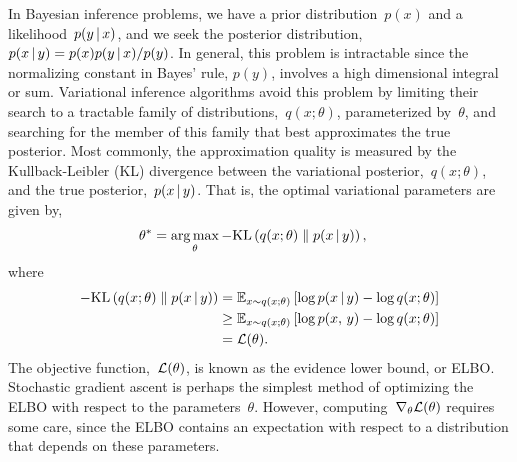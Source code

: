 In Bayesian inference problems, we have a prior distribution~$p(x)$
and a likelihood~$p(y \, | \, x)$, and
we seek the posterior distribution,~${p(x \, | \, y) = p(x) p(y \, | \, x) / p(y)}$.
In general, this problem is intractable since the normalizing constant
in Bayes' rule, $p(y)$, involves a high dimensional integral or sum.
Variational inference algorithms avoid this problem by limiting their
search to a tractable family of distributions,~$q(x; \theta)$,
parameterized by~$\theta$, and searching for the member of this family
that best approximates the true posterior. Most commonly, the
approximation quality is measured by the Kullback-Leibler (KL)
divergence between the variational posterior,~$q(x; \theta)$, and the
true posterior,~$p(x \, | \, y)$. That is, the optimal variational
parameters are given by,
\begin{align}
  \theta^* &= \operatorname*{arg\,max}_\theta -\textrm{KL}\left(q(x; \theta)\;\|\;p(x \, | \, y)\right),
\end{align}
where
\begin{align}
  -\textrm{KL}\left(q(x; \theta)\;\|\;p(x \, | \, y)\right) &= \mathbb{E}_{x \sim q(x; \theta)}
  \left[ \log p(x \, | \, y) - \log q(x; \theta) \right] \\
  &\geq \mathbb{E}_{x \sim q(x; \theta)}
  \left[ \log p(x, \, y) - \log q(x; \theta) \right] \\
  &= \mathcal{L}(\theta).
\end{align}
The objective function,~$\mathcal{L}(\theta)$, is known as the evidence lower bound, or ELBO.
Stochastic gradient ascent is
perhaps the simplest method of optimizing the ELBO with respect to
the parameters~$\theta$.
However, computing~$\nabla_\theta \mathcal{L}(\theta)$ requires some care,
since the ELBO contains an expectation with respect to a distribution
that depends on these parameters.

